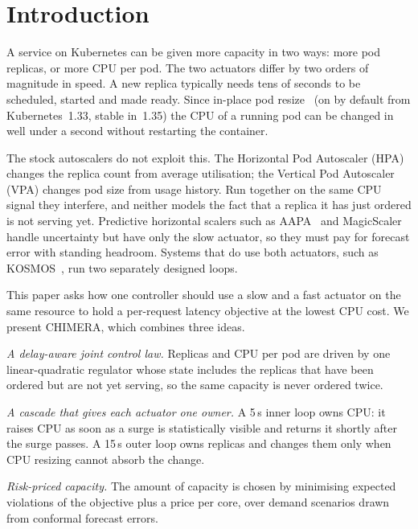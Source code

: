 \documentclass[conference]{IEEEtran}
\begin{document}
\section{Introduction}

A service on Kubernetes can be given more capacity in two ways: more pod replicas, or more
CPU per pod. The two actuators differ by two orders of magnitude in speed. A new replica
typically needs tens of seconds to be scheduled, started and made ready. Since in-place pod
resize~\cite{kep1287} (on by default from Kubernetes~1.33, stable in~1.35) the CPU of a
running pod can be changed in well under a second without restarting the container.

The stock autoscalers do not exploit this. The Horizontal Pod Autoscaler (HPA) changes the
replica count from average utilisation; the Vertical Pod Autoscaler (VPA) changes pod size
from usage history. Run together on the same CPU signal they interfere, and neither models
the fact that a replica it has just ordered is not serving yet. Predictive horizontal
scalers such as AAPA~\cite{aapa} and MagicScaler~\cite{magicscaler} handle uncertainty but
have only the slow actuator, so they must pay for forecast error with standing headroom.
Systems that do use both actuators, such as KOSMOS~\cite{kosmos}, run two separately
designed loops.

This paper asks how one controller should use a slow and a fast actuator on the same
resource to hold a per-request latency objective at the lowest CPU cost. We present
CHIMERA, which combines three ideas.

\emph{A delay-aware joint control law.} Replicas and CPU per pod are driven by one
linear-quadratic regulator whose state includes the replicas that have been ordered but
are not yet serving, so the same capacity is never ordered twice.

\emph{A cascade that gives each actuator one owner.} A 5\,s inner loop owns CPU: it raises
CPU as soon as a surge is statistically visible and returns it shortly after the surge
passes. A 15\,s outer loop owns replicas and changes them only when CPU resizing cannot
absorb the change.

\emph{Risk-priced capacity.} The amount of capacity is chosen by minimising expected
violations of the objective plus a price per core, over demand scenarios drawn from
conformal forecast errors.
\end{document}
